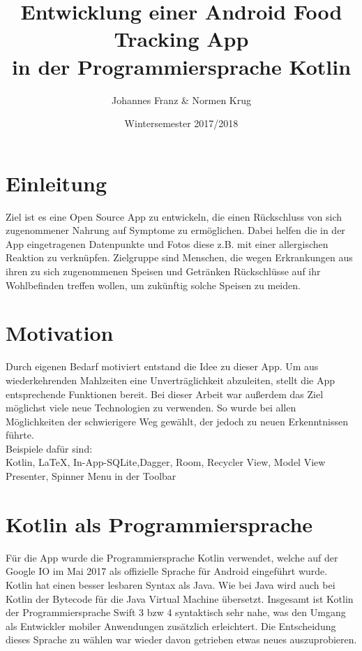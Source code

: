 \documentclass[
    DIV12,
    cleardouble=plain,
    headings=normal,
    pdftex,
    headexclude,footexclude,
    final
]{scrreprt}
\title{
  Entwicklung einer Android Food Tracking App \\[1em]
  in der Programmiersprache Kotlin  
}
\author{Johannes Franz \& Normen Krug}
\date{Wintersemester 2017/2018}
\begin{document}
\maketitle



\tableofcontents


\newpage
{}


\chapter{Einleitung}
Ziel ist es eine Open Source App zu entwickeln, die einen Rückschluss von sich zugenommener Nahrung auf Symptome zu ermöglichen. Dabei helfen die in der App eingetragenen Datenpunkte und Fotos diese z.B. mit einer allergischen Reaktion zu verknüpfen.
Zielgruppe sind Menschen, die wegen Erkrankungen aus ihren zu sich zugenommenen Speisen und Getränken Rückschlüsse auf ihr Wohlbefinden treffen wollen, um zukünftig solche Speisen zu meiden.


\chapter{Motivation}
Durch eigenen Bedarf motiviert entstand die Idee zu dieser App. Um aus wiederkehrenden Mahlzeiten eine Unverträglichkeit abzuleiten, stellt die App entsprechende Funktionen bereit.
Bei dieser Arbeit war außerdem das Ziel möglichst viele neue Technologien zu verwenden. So wurde bei allen Möglichkeiten der schwierigere Weg gewählt, der jedoch zu neuen Erkenntnissen führte.\\
Beispiele dafür sind:\\
Kotlin, LaTeX, In-App-SQLite,Dagger, Room, Recycler View, Model View Presenter, Spinner Menu in der Toolbar

\newpage

\chapter{Kotlin als Programmiersprache}
Für die App wurde die Programmiersprache Kotlin verwendet, welche auf der Google IO im Mai 2017 als offizielle Sprache für Android eingeführt wurde. Kotlin hat einen besser lesbaren Syntax als Java. Wie bei Java wird auch bei Kotlin der Bytecode für die Java Virtual Machine übersetzt. Insgesamt ist Kotlin der Programmiersprache Swift 3 bzw 4 syntaktisch sehr nahe, was den Umgang als Entwickler mobiler Anwendungen zusätzlich erleichtert. Die Entscheidung dieses Sprache zu wählen war wieder davon getrieben etwas neues auszuprobieren.\\
\end{document}
